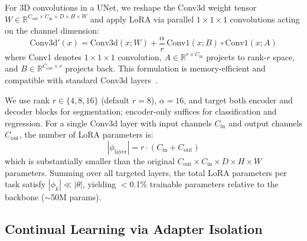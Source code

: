 \documentclass[journal,twoside,web]{ieeecolor}
\begin{document}
For 3D convolutions in a UNet, we reshape the Conv3d weight tensor $W \in \mathbb{R}^{C_{\text{out}} \times C_{\text{in}} \times D \times H \times W}$ and apply LoRA via parallel $1\times1\times1$ convolutions acting on the channel dimension:
\begin{equation}
\text{Conv3d}'(x) = \text{Conv3d}(x; W) + \frac{\alpha}{r} \, \text{Conv1}(x; B) \circ \text{Conv1}(x; A)
\label{eq:lora3d}
\end{equation}
where Conv1 denotes $1\times1\times1$ convolution, $A \in \mathbb{R}^{r \times C_{\text{in}}}$ projects to rank-$r$ space, and $B \in \mathbb{R}^{C_{\text{out}} \times r}$ projects back. This formulation is memory-efficient and compatible with standard Conv3d layers~\cite{peft}.

We use rank $r \in \{4, 8, 16\}$ (default $r=8$), $\alpha=16$, and target both encoder and decoder blocks for segmentation; encoder-only suffices for classification and regression. For a single Conv3d layer with input channels $C_{\text{in}}$ and output channels $C_{\text{out}}$, the number of LoRA parameters is:
\begin{equation}
|\phi_{\text{layer}}| = r \cdot (C_{\text{in}} + C_{\text{out}})
\label{eq:param_count}
\end{equation}
which is substantially smaller than the original $C_{\text{out}} \times C_{\text{in}} \times D \times H \times W$ parameters. Summing over all targeted layers, the total LoRA parameters per task satisfy $|\phi_k| \ll |\theta|$, yielding $<$0.1\% trainable parameters relative to the backbone ($\sim$50M params).

\subsection{Continual Learning via Adapter Isolation}
\label{sec:continual}
\end{document}
